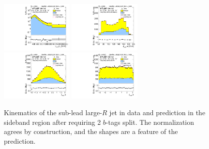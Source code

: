\begin{figure}[htbp!]
\begin{center}
\includegraphics[width=0.32\textwidth,angle=-90]{figures/boosted/Sideband/b77_TwoTag_split_Sideband_sublHCand_Pt_m_1.pdf}
\includegraphics[width=0.32\textwidth,angle=-90]{figures/boosted/Sideband/b77_TwoTag_split_Sideband_sublHCand_Mass_s.pdf}\\
\includegraphics[width=0.32\textwidth,angle=-90]{figures/boosted/Sideband/b77_TwoTag_split_Sideband_sublHCand_Eta.pdf}
\includegraphics[width=0.32\textwidth,angle=-90]{figures/boosted/Sideband/b77_TwoTag_split_Sideband_sublHCand_Phi.pdf}
  \caption{Kinematics of the sub-lead large-$R$ jet in data and prediction in the sideband region after requiring 2 $b$-tags split. The normalization agrees by construction, and the shapes are a feature of the prediction.}
  \label{fig:boosted-2bs-sideband-ak10-subl}
\end{center}
\end{figure}

